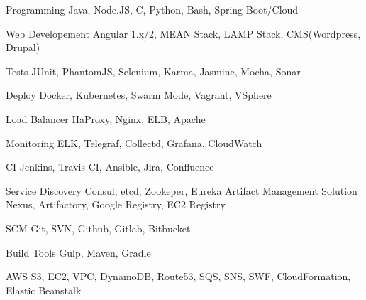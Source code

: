 

\begin{cvskills}


\cvskill
{Programming} %
{Java, Node.JS, C, Python, Bash, Spring Boot/Cloud} %


\cvskill
{Web Developement} %
{Angular 1.x/2, MEAN Stack, LAMP Stack, CMS(Wordpress, Drupal)} %

\cvskill
{Tests} %
{JUnit, PhantomJS, Selenium, Karma, Jasmine, Mocha, Sonar} %

\cvskill
{Deploy} %
{Docker, Kubernetes, Swarm Mode, Vagrant, VSphere} %

\cvskill
{Load Balancer} %
{HaProxy, Nginx, ELB, Apache} %

\cvskill
{Monitoring} %
{ELK, Telegraf, Collectd, Grafana, CloudWatch} %

\cvskill
{CI} %
{Jenkins, Travis CI, Ansible, Jira, Confluence} %

\cvskill
{Service Discovery} %
{Consul, etcd, Zookeper, Eureka} %
\cvskill
{Artifact Management Solution} %
{Nexus, Artifactory, Google Registry, EC2 Registry} %

\cvskill
{SCM} %
{Git, SVN, Github, Gitlab, Bitbucket} %

\cvskill
{Build Tools} %
{Gulp, Maven, Gradle} %


\cvskill
{AWS} %
{S3, EC2, VPC, DynamoDB, Route53, SQS, SNS, SWF, CloudFormation, Elastic Beanstalk} %


\end{cvskills}
